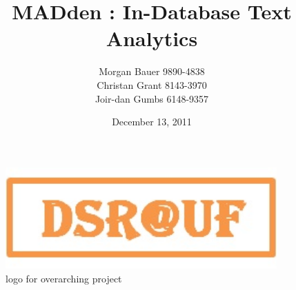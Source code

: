 \documentclass{article}
\title{MADden : In-Database Text Analytics}
\author{Morgan Bauer 9890-4838 \\
  Christan Grant 8143-3970 \\
  Joir-dan Gumbs 6148-9357}
\date{December 13, 2011}
\begin{document}
\maketitle

\begin{figure}
  \begin{center}
    \includegraphics[width=104mm]{logo.jpg}
    \caption{logo for overarching project}
    \label{fig:logo}
  \end{center}
\end{figure}
\end{document}
